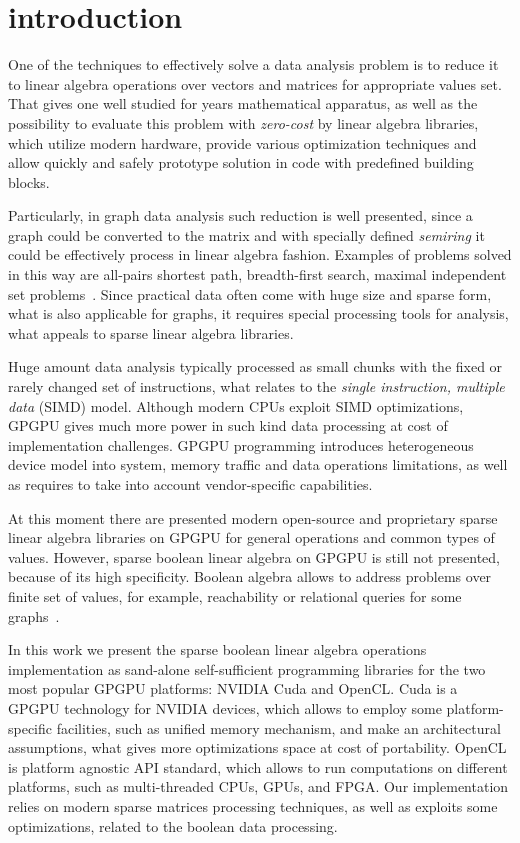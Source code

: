 \section{introduction}


One of the techniques to effectively solve a data analysis problem is to reduce it to linear
algebra operations over vectors and matrices for appropriate values set. That gives one well 
studied for years mathematical apparatus, as well as the possibility to evaluate this problem with 
\textit{zero-cost} by linear algebra libraries, which utilize modern hardware, provide various 
optimization techniques and allow quickly and safely prototype solution in code with predefined 
building blocks.

Particularly, in graph data analysis such reduction is well presented, since a graph could be 
converted to the matrix and with specially defined \textit{semiring} it could be effectively 
process in linear algebra fashion. Examples of problems solved in this way are all-pairs shortest 
path, breadth-first search, maximal independent set problems~\cite{todo}. Since practical data 
often come with huge size and sparse form, what is also applicable for graphs, it requires special 
processing tools for analysis, what appeals to sparse linear algebra libraries.

Huge amount data analysis typically processed as small chunks with the fixed or rarely changed set 
of instructions, what relates to the \textit{single instruction, multiple data} (SIMD) model. 
Although modern CPUs exploit SIMD optimizations, GPGPU gives much more power in such kind data 
processing at cost of implementation challenges. GPGPU programming introduces heterogeneous device 
model into system, memory traffic and data operations limitations, as well as requires to take into
account vendor-specific capabilities. 

At this moment there are presented modern open-source and proprietary sparse linear algebra 
libraries on GPGPU for general operations and common types of values. However, sparse boolean 
linear algebra on GPGPU is still not presented, because of its high specificity. Boolean algebra 
allows to address problems over finite set of values, for example, reachability or relational 
queries for some graphs~\cite{todo}.

In this work we present the sparse boolean linear algebra operations implementation as sand-alone 
self-sufficient programming libraries for the two most popular GPGPU platforms: NVIDIA Cuda and 
OpenCL. Cuda is a GPGPU technology for NVIDIA devices, which allows to employ some 
platform-specific facilities, such as unified memory mechanism, and make an architectural 
assumptions, what gives more optimizations space at cost of portability. OpenCL is platform 
agnostic API standard, which allows to run computations on different platforms, such as 
multi-threaded CPUs, GPUs, and FPGA. Our implementation relies on modern sparse matrices processing
techniques, as well as exploits some optimizations, related to the boolean data processing.